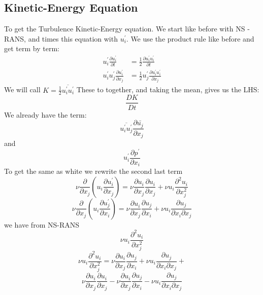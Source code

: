 \documentclass[a4paper,norsk]{article}
\begin{document}
\subsection{Kinetic-Energy Equation}
To get the Turbulence Kinetic-Energy equation. We start like before with NS - RANS, and times this equation with $u_i^{'}$.
We use the product rule like before and get term by term:
\begin{align*}
u_i^{'}\frac{\partial u_i^{'}}{\partial t} &= \frac{1}{2}\frac{\partial u_i^{'}u_i^{'}}{\partial t} \\
u_i^{'}u_j^{'} \frac{\partial u_i^{'}}{\partial x_j} &= \frac{1}{2}u_j^{'}\frac{\partial u_i^{'}u_i^{'}}{\partial x_j}
\end{align*}
We will call  $ K = \frac{1}{2}\overline{u_i^{'}u_i^{'}}$ 
These to together, and taking the mean, gives us the LHS:
$$ \frac{DK}{Dt}   $$
We already have the term:
$$  \overline{u_i^{'}u_j^{'}}\frac{\partial \bar{u_j}}{\partial x_j} $$ 
and 
$$ u_i^{'}\frac{\partial p^{'}}{\partial x_i} $$
To get the same as white we rewrite the second last term
$$\nu \frac{\partial }{\partial x_j} (u_i \frac{\partial u_i^{'}}{\partial x_j}) = \nu\frac{\partial u_i}{\partial x_j}\frac{\partial u_i}{\partial x_j} +\nu  u_i \frac{\partial^2 u_i}{\partial x_j^2}       $$
$$\nu \frac{\partial }{\partial x_j} (u_i \frac{\partial u_j^{'}}{\partial x_i}) =\nu \frac{\partial u_i}{\partial x_j}\frac{\partial u_j}{\partial x_i} + \nu u_i \frac{\partial u_j}{\partial x_i \partial x_j}       $$
we have from NS-RANS
$$\nu  u_i \frac{\partial^2 u_i}{\partial x_j^2}  $$
$$ \nu  u_i \frac{\partial^2 u_i}{\partial x_j^2} = \nu \frac{\partial u_i}{\partial x_j}\frac{\partial u_j}{\partial x_i} + \nu u_i \frac{\partial u_j}{\partial x_i \partial x_j}  +$$
$$  \nu\frac{\partial u_i}{\partial x_j}\frac{\partial u_i}{\partial x_j} - \nu \frac{\partial u_i}{\partial x_j}\frac{\partial u_j}{\partial x_i} - \nu u_i \frac{\partial u_j}{\partial x_i \partial x_j} $$
\end{document}
